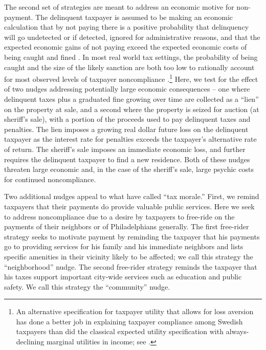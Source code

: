\documentclass[12pt]{article}
\begin{document}
The second set of strategies are meant to address an economic motive
for non-payment.  The delinquent taxpayer is assumed to be making an
economic calculation that by not paying there is a positive
probability that delinquency will go undetected or if detected,
ignored for administrative reasons, and that the expected economic
gains of not paying exceed the expected economic costs of being caught
and fined \cite{Allingham-Sandmo-72}.  In most real world tax
settings, the probability of being caught and the size of the
likely sanction are both too low to rationally account for most
observed levels of taxpayer noncompliance \cite{Alm-92}.\footnote{An
  alternative specification for taxpayer utility that allows for loss
  aversion has done a better job in explaining taxpayer compliance
  among Swedish taxpayers than did the classical expected utility
  specification with always-declining marginal utilities in income;
  see . } Here, we test for the effect of two nudges
addressing potentially large economic consequences -- one where delinquent
taxes plus a graduated fine growing over time are collected as a
``lien'' on the property at sale, and a second where the property
is seized for auction (at sheriff's sale), with a portion of the
proceeds used to pay delinquent taxes and penalties. The lien imposes
a growing real dollar future loss on the delinquent taxpayer as the
interest rate for penalties exceeds the taxpayer's alternative rate
of return. The sheriff's sale imposes an immediate economic loss,
and further requires the delinquent taxpayer to find a new residence.
Both of these nudges threaten large economic and, in the case of the
sheriff's sale, large psychic costs for continued noncompliance.

Two additional nudges appeal to what  have called
``tax morale.''  First, we remind taxpayers that their payments do
provide valuable public services.  Here we seek to address
noncompliance due to a desire by taxpayers to free-ride on the
payments of their neighbors or of Philadelphians generally.  The first
free-rider strategy seeks to motivate payment by reminding the
taxpayer that his payments go to providing services for his family and
his immediate neighbors and lists specific amenities in their vicinity
likely to be affected; we call this strategy the ``neighborhood''
nudge.  The second free-rider strategy reminds the taxpayer that his
taxes support important city-wide services such as education and public
safety. We call this strategy the ``community'' nudge.
  
\end{document}
